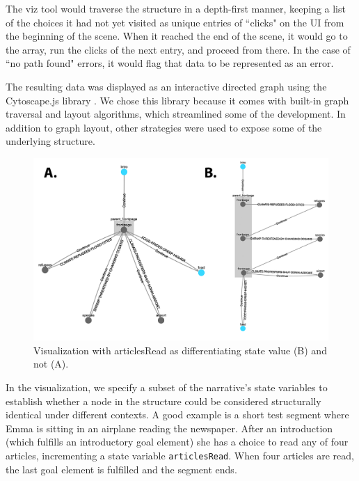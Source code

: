 The viz tool would traverse the structure in a depth-first manner, keeping a list of the choices it had not yet visited as unique entries of ``clicks" on the UI from the beginning of the scene. When it reached the end of the scene, it would go to the array, run the clicks of the next entry, and proceed from there. In the case of ``no path found" errors, it would flag that data to be represented as an error.

The resulting data was displayed as an interactive directed graph using the Cytoscape.js library \cite{cytoscape}. We chose this library because it comes with built-in graph traversal and layout algorithms, which streamlined some of the development. In addition to graph layout, other strategies were used to expose some of the underlying structure.


\begin{figure}
    \centering
    \includegraphics[width=\textwidth]{figures/3-StoryAssembler/viz1.png}
    \caption{Visualization with articlesRead as differentiating state value (B) and not (A).}
    \label{fig:viz}
\end{figure}


In the visualization, we specify a subset of the narrative's state variables to establish whether a node in the structure could be considered structurally identical under different contexts. A good example is a short test segment where Emma is sitting in an airplane reading the newspaper. After an introduction (which fulfills an introductory goal element) she has a choice to read any of four articles, incrementing a state variable \texttt{articlesRead}. When four articles are read, the last goal element is fulfilled and the segment ends.

